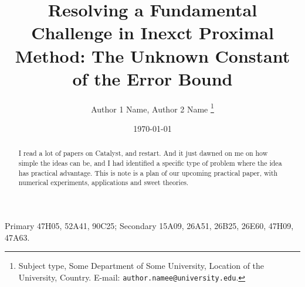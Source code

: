 \documentclass[12pt]{article}
\begin{document}
\title{{\selectfont Resolving a Fundamental Challenge in Inexct Proximal Method: The Unknown Constant of the Error Bound }}

\author{
    Author 1 Name, Author 2 Name
    \thanks{
        Subject type, Some Department of Some University, Location of the University,
        Country. E-mail: \texttt{author.namee@university.edu}.
    }
}

\date{\today}

\maketitle
{}

\begin{abstract} 
    \noindent
    I read a lot of papers on Catalyst, and restart. 
    And it just dawned on me on how simple the ideas can be, and I had identified a specific type of problem where the idea has practical advantage. 
    This is note is a plan of our upcoming practical paper, with numerical experiments, applications and sweet theories. 
\end{abstract}

Primary 47H05, 52A41, 90C25; Secondary 15A09, 26A51, 26B25, 26E60, 47H09, 47A63.

\end{document}
